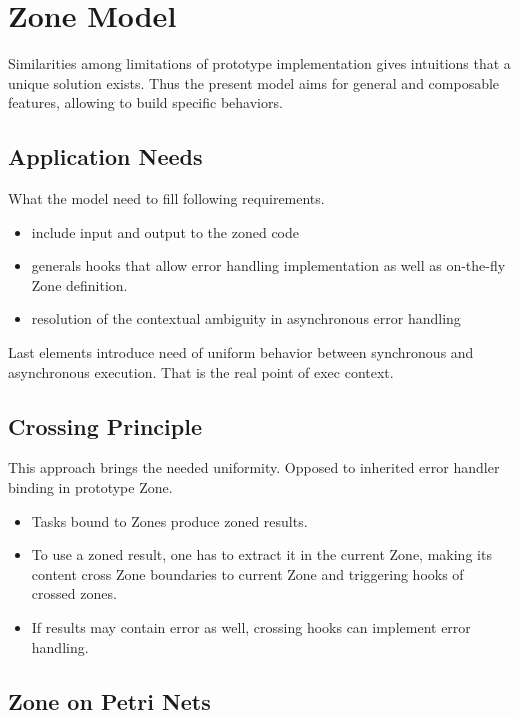 
\chapter{Zone Model}

Similarities among limitations of prototype implementation gives intuitions that a unique solution exists. Thus the present model aims for general and composable features, allowing to build specific behaviors.

\section{Application Needs}

What the model need to fill following requirements.

\begin{itemize}
\item include input and output to the zoned code
\item generals hooks that allow error handling implementation as well as on-the-fly Zone definition.
\item resolution of the contextual ambiguity in asynchronous error handling
\end{itemize}

Last elements introduce need of uniform behavior between synchronous and asynchronous execution.
That is the real point of exec context.

\section{Crossing Principle}

This approach brings the needed uniformity. Opposed to inherited error handler binding in prototype Zone.

\begin{itemize}
\item Tasks bound to Zones produce zoned results.
\item To use a zoned result, one has to extract it in the current Zone, making its content cross Zone boundaries to current Zone and triggering hooks of crossed zones.
\item If results may contain error as well, crossing hooks can implement error handling.
\end{itemize}

\section{Zone on Petri Nets}

